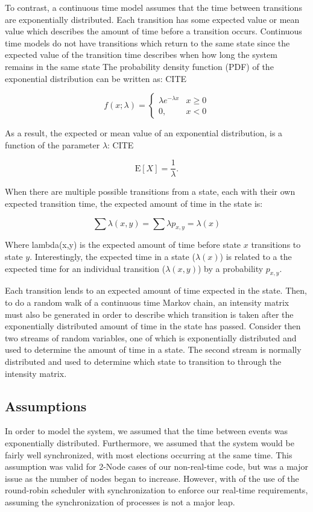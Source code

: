 To contrast, a continuous time model assumes that the time between transitions
are exponentially distributed. Each transition has some expected value or mean
value which describes the amount of time before a transition occurs. Continuous
time models do not have transitions which return to the same state since the
expected value of the transition time describes when how long the system 
remains in the same state The probability density
function (PDF) of the exponential distribution can be written as: CITE

\begin{equation}
f(x;\lambda) = \begin{cases}
\lambda e^{-\lambda x} & x \ge 0 \\
0, & x < 0
\end{cases}
\end{equation}

As a result, the expected or mean value of an exponential distribution, is a function of
the parameter $\lambda$: CITE

\begin{equation}
\mathrm{E}[X] = \frac{1}{\lambda}. \!
\end{equation}

When there are multiple possible transitions from a state, each with their own
expected transition time, the expected amount of time in the state is:

\begin{equation}
\sum \lambda(x,y) = \sum \lambda p_{x,y} = \lambda(x)
\end{equation}

Where lambda(x,y) is the expected amount of time before state $x$ transitions to
state $y$. Interestingly, the expected time in a state ($\lambda(x)$) is related
to a the expected time for an individual transition ($\lambda(x,y)$) by a probability
$p_{x,y}$.

Each transition lends to an expected amount of time expected in the state. Then,
to do a random walk of a continuous time Markov chain, an intensity matrix must
also be generated in order to describe which transition is taken after the
exponentially distributed amount of time in the state has passed. Consider then
two streams of random variables, one of which is exponentially distributed and
used to determine the amount of time in a state. The second stream is normally
distributed and used to determine which state to transition to through the
intensity matrix.

\subsection{Assumptions}
In order to model the system, we assumed that the time between events was
exponentially distributed. Furthermore, we assumed that the system would be
fairly well synchronized, with most elections occurring at the same time. This
assumption was valid for 2-Node cases of our non-real-time code, but was
a major issue as the number of nodes began to increase. However, with of
the use of the round-robin scheduler with synchronization to enforce our
real-time requirements, assuming the synchronization of processes is not a
major leap.

